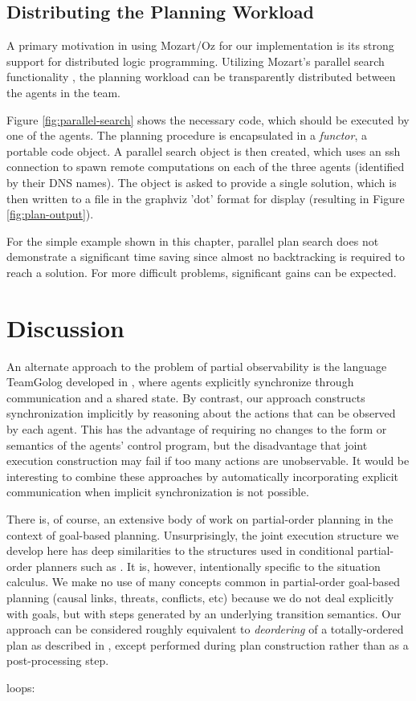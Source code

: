 \subsection{Distributing the Planning Workload}

A primary motivation in using Mozart/Oz for our implementation is
its strong support for distributed logic programming. Utilizing Mozart's
parallel search functionality \citep{Schulte00constraint_services},
the planning workload can be transparently distributed between the
agents in the team.

Figure \ref{fig:parallel-search} shows the necessary code, which
should be executed by one of the agents. The planning procedure is
encapsulated in a \emph{functor}, a portable code object. A parallel
search object is then created, which uses an ssh connection to spawn
remote computations on each of the three agents (identified by their
DNS names). The object is asked to provide a single solution, which
is then written to a file in the graphviz 'dot' format for display
(resulting in Figure \ref{fig:plan-output}).

For the simple example shown in this chapter, parallel plan search
does not demonstrate a significant time saving since almost no backtracking
is required to reach a solution. For more difficult problems, significant
gains can be expected.


\section{Discussion\label{sec:JointExec:Discussion}}

An alternate approach to the problem of partial observability is the
language TeamGolog developed in \citep{farinelli07team_golog}, where
agents explicitly synchronize through communication and a shared state.
By contrast, our approach constructs synchronization implicitly by
reasoning about the actions that can be observed by each agent. This
has the advantage of requiring no changes to the form or semantics
of the agents' control program, but the disadvantage that joint execution
construction may fail if too many actions are unobservable. It would
be interesting to combine these approaches by automatically incorporating
explicit communication when implicit synchronization is not possible.

There is, of course, an extensive body of work on partial-order planning
in the context of goal-based planning. Unsurprisingly, the joint execution
structure we develop here has deep similarities to the structures
used in conditional partial-order planners such as \citep{peot92conditional_nonlinear}.
It is, however, intentionally specific to the situation calculus.
We make no use of many concepts common in partial-order goal-based
planning (causal links, threats, conflicts, etc) because we do not
deal explicitly with goals, but with steps generated by an underlying
transition semantics. Our approach can be considered roughly equivalent
to \emph{deordering} of a totally-ordered plan as described in \citep{backstrom99reordering},
except performed during plan construction rather than as a post-processing
step.



loops: \citep{levesque96what_is_planning,levesque05planning_with_loops}


